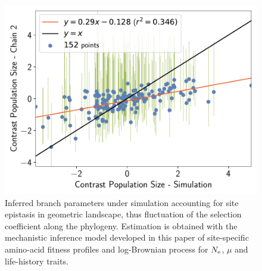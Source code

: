 \documentclass{article}
\begin{document}
\begin{figure}[H]
\begin{minipage}{0.32\linewidth}
			\includegraphics[width=\linewidth, page=1]{simulations/SimuGeo_SiteMutSelBranchNe_BranchCorrelation_ContrastPopulationSize}
		\end{minipage} \hfill
		\caption[Inferred branch parameters for \texttt{SimuGeo}]{
		Inferred branch parameters under simulation accounting for site epistasis in geometric landscape, thus fluctuation of the selection coefficient along the phylogeny.
		Estimation is obtained with the mechanistic inference model developed in this paper of site-specific amino-acid fitness profiles and log-Brownian process for $\Ne$, $\mu$ and life-history traits.
		}
	\end{figure}


	\begin{table}[H]
		\centering
		\noindent{}
		\caption[Amino-acid entropy for \texttt{SimuGeo}]{
		Estimated amino-acid entropy under simulation accounting for site epistasis (geometric landscape), thus fluctuation of the selection coefficient along the phylogeny.
		Estimation is obtained with the mechanistic inference model developed in this paper of site-specific amino-acid fitness profiles and log-Brownian process for $\Ne$, $\mu$ and life-history traits (in the left column), or under the assumption of constant $\Ne$ (in the right column).
		}
	\end{table}
\end{document}
